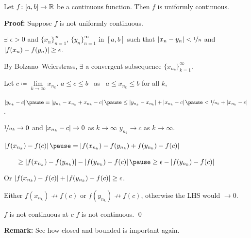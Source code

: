 \documentclass[10pt,aspectratio=169]{beamer}
\begin{document}
\begin{frame}

\begin{theorem}
Let $f \colon [a,b] \to {\mathbb{R}}$ be a continuous function.  Then $f$
is uniformly continuous.
\end{theorem}

\pause
\textbf{Proof:}
Suppose $f$ is not uniformly continuous.

\pause
$\exists$ $\epsilon > 0$ and 
$\{ x_n \}_{n=1}^\infty$, $\{ y_n \}_{n=1}^\infty$ in $[a,b]$
such that
$\left\lvert {x_n-y_n} \right\rvert < \nicefrac{1}{n}$ and $\left\lvert {f(x_n)-f(y_n)} \right\rvert \geq
\epsilon$.

\pause
By Bolzano--Weierstrass,
$\exists$ a convergent subsequence $\{ x_{n_k} \}_{k=1}^\infty$.

\pause
Let $c \coloneqq \lim\limits_{k\to\infty} x_{n_k}$.
\pause
\quad
$a \leq c \leq b$~ as ~$a \leq x_{n_k} \leq b$ for all $k$,

\pause
\medskip

$
\abs{y_{n_k} - c}
\pause
=
\abs{y_{n_k} - x_{n_k} + x_{n_k} - c}
\pause
\leq
\abs{y_{n_k} - x_{n_k}}
+
\abs{x_{n_k}-c}
\pause
<
\nicefrac{1}{n_k} 
+
\abs{x_{n_k}-c}$.

\pause
\medskip

$\nicefrac{1}{n_k} \to 0$ and $\left\lvert {x_{n_k}-c} \right\rvert \to 0$ as $k \to \infty$
\pause
\wthus $y_{n_k} \to c$ as $k \to \infty$.

\pause
\medskip

$\abs{f(x_{n_k}) - f(c)}
\pause
=
\abs{f(x_{n_k}) - f(y_{n_k}) + f(y_{n_k}) - f(c)}$

\pause
\medskip

$\qquad \geq
\abs{f(x_{n_k}) - f(y_{n_k})} - \abs{f(y_{n_k}) - f(c)}
\pause
\geq
\epsilon - \abs{f(y_{n_k})-f(c)}$

\pause
\medskip

Or \qquad
$\left\lvert {f(x_{n_k})-f(c)} \right\rvert 
+
\left\lvert {f(y_{n_k})-f(c)} \right\rvert
\geq
\epsilon$.

\pause
\medskip

Either $f(x_{n_k}) \not\to f(c)$ or
$f(y_{n_k}) \not\to f(c)$, otherwise the LHS would $\to 0$.

\pause
\medskip

\thus \quad $f$ is not continuous at $c$
\pause
\wthus $f$ is not continuous.
\qed

\pause
\medskip

\textbf{Remark:} See how closed and bounded is important again.

\end{frame}
\end{document}
